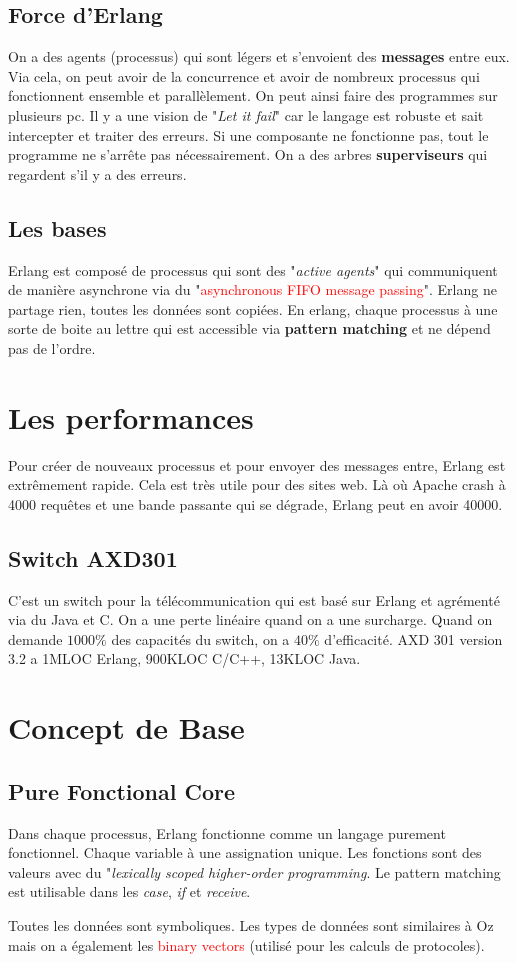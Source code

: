 \documentclass{report}
\begin{document}
\subsection{Force d'Erlang}
On a des agents (processus) qui sont légers et s'envoient des \textbf{messages} entre eux. Via cela, on peut avoir de la concurrence et avoir de nombreux processus qui fonctionnent ensemble et parallèlement. On peut ainsi faire des programmes sur plusieurs pc. Il y a une vision de "\textit{Let it fail}" car le langage est robuste et sait intercepter et traiter des erreurs. Si une composante ne fonctionne pas, tout le programme ne s'arrête pas nécessairement. On a des arbres \textbf{superviseurs} qui regardent s'il y a des erreurs.

\subsection{Les bases}
Erlang est composé de processus qui sont des "\textit{active agents}" qui communiquent de manière asynchrone via du "\textcolor{red}{asynchronous FIFO message passing}". Erlang ne partage rien, toutes les données sont copiées. En erlang, chaque processus à une sorte de boite au lettre qui est accessible via \textbf{pattern matching} et ne dépend pas de l'ordre.

\section{Les performances}
Pour créer de nouveaux processus et pour envoyer des messages entre, Erlang est extrêmement rapide. Cela est très utile pour des sites web. Là où Apache crash à 4000 requêtes et une bande passante qui se dégrade, Erlang peut en avoir 40000.
\subsection{Switch AXD301}
C'est un switch pour la télécommunication qui est basé sur Erlang et agrémenté via du Java et C. On a une perte linéaire quand on a une surcharge. Quand on demande $1000\%$ des capacités du switch, on a $40\%$ d'efficacité. AXD 301 version 3.2 a 1MLOC Erlang, 900KLOC C/C++, 13KLOC Java.

\section{Concept de Base}
\subsection{Pure Fonctional Core}
Dans chaque processus, Erlang fonctionne comme un langage purement fonctionnel. Chaque variable à une assignation unique. Les fonctions sont des valeurs avec du "\textit{lexically scoped higher-order programming}. Le pattern matching est utilisable dans les \textit{case}, \textit{if} et \textit{receive}.\par 
Toutes les données sont symboliques. Les types de données sont similaires à Oz mais on a également les \textcolor{red}{binary vectors} (utilisé pour les calculs de protocoles). 
\end{document}
